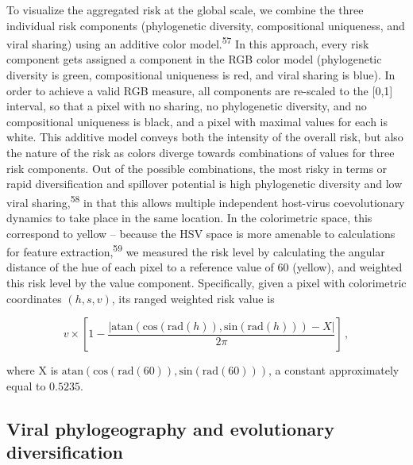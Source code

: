 \documentclass[11pt]{article}
\begin{document}
To visualize the aggregated risk at the global scale, we combine the
three individual risk components (phylogenetic diversity, compositional
uniqueness, and viral sharing) using an additive color
model.\textsuperscript{57} In this approach, every risk component gets
assigned a component in the RGB color model (phylogenetic diversity is
green, compositional uniqueness is red, and viral sharing is blue). In
order to achieve a valid RGB measure, all components are re-scaled to
the {[}0,1{]} interval, so that a pixel with no sharing, no phylogenetic
diversity, and no compositional uniqueness is black, and a pixel with
maximal values for each is white. This additive model conveys both the
intensity of the overall risk, but also the nature of the risk as colors
diverge towards combinations of values for three risk components. Out of
the possible combinations, the most risky in terms or rapid
diversification and spillover potential is high phylogenetic diversity
and low viral sharing,\textsuperscript{58} in that this allows multiple
independent host-virus coevolutionary dynamics to take place in the same
location. In the colorimetric space, this correspond to yellow --
because the HSV space is more amenable to calculations for feature
extraction,\textsuperscript{59} we measured the risk level by
calculating the angular distance of the hue of each pixel to a reference
value of 60 (yellow), and weighted this risk level by the value
component. Specifically, given a pixel with colorimetric coordinates
\((h,s,v)\), its ranged weighted risk value is

\[
v\times\left[1-\frac{\left|\text{atan}\left(\text{cos}(\text{rad}(h)), \text{sin}(\text{rad}(h))\right) - X\right|}{2\pi}\right]\,,
\]

where X is
\(\text{atan}\left(\text{cos}(\text{rad}(60)), \text{sin}(\text{rad}(60))\right)\),
a constant approximately equal to \(0.5235\).

\hypertarget{viral-phylogeography-and-evolutionary-diversification}{%
\subsection{Viral phylogeography and evolutionary
diversification}\label{viral-phylogeography-and-evolutionary-diversification}}
\end{document}
